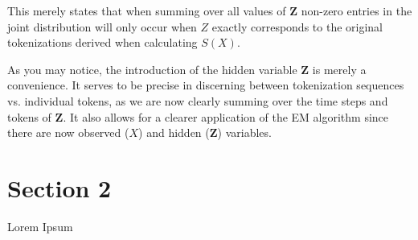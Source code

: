 \documentclass[11pt]{article}
\newcommand{\vect}[1]{\mathbf{#1}}
\begin{document}
This merely states that when summing over all values of $\vect{Z}$ non-zero entries in the joint distribution will only occur when $Z$ exactly corresponds 
to the original tokenizations derived when calculating $S(X)$.

As you may notice, the introduction of the hidden variable $\vect{Z}$ is merely a convenience. 
It serves to be precise in discerning between tokenization sequences vs. individual tokens, as we are now clearly summing over the time steps and tokens of $\vect{Z}$.
It also allows for a clearer application of 
the EM algorithm since there are now observed ($X$) and hidden ($\vect{Z}$) variables.

\pagebreak
\section{Section 2}
Lorem Ipsum \\

\end{document}
